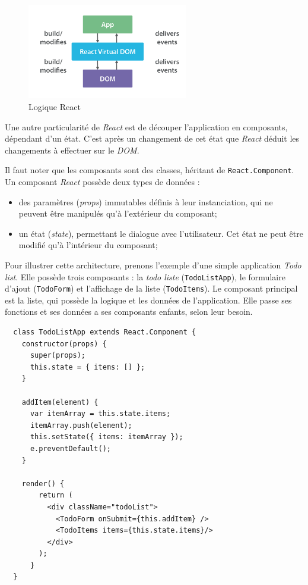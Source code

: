 \documentclass[12pt,a4paper]{article}
\providecommand{\tightlist}{%
  \setlength{\itemsep}{0pt}\setlength{\parskip}{0pt}}
\begin{document}
  \bigskip

  \begin{figure}[h]
    \centering
    \includegraphics[width=7cm]{figures/react-map.png}
    \caption{Logique React}
  \end{figure}

  \bigskip

  Une autre particularité de \emph{React} est de découper l'application en
  composants, dépendant d'un état. C'est après un changement de cet état
  que \emph{React} déduit les changements à effectuer sur le \emph{DOM}.

  \bigskip

  Il faut noter que les composants sont des classes, héritant de
  \texttt{React.Component}. Un composant \emph{React} possède deux types
  de données :

  \begin{itemize}
  \tightlist
  \item
    des paramètres (\emph{props}) immutables définis à leur instanciation,
    qui ne peuvent être manipulés qu'à l'extérieur du composant;
  \item
    un état (\emph{state}), permettant le dialogue avec l'utilisateur. Cet
    état ne peut être modifié qu'à l'intérieur du composant;
  \end{itemize}

  \bigskip

  Pour illustrer cette architecture, prenons l'exemple d'une simple
  application \emph{Todo list}. Elle possède trois composants : la
  \emph{todo liste} (\texttt{TodoListApp}), le formulaire d'ajout
  (\texttt{TodoForm}) et l'affichage de la liste (\texttt{TodoItems}). Le
  composant principal est la liste, qui possède la logique et les données
  de l'application. Elle passe ses fonctions et ses données a ses
  composants enfants, selon leur besoin.

  \begin{verbatim}
  class TodoListApp extends React.Component {
    constructor(props) {
      super(props);
      this.state = { items: [] };
    }

    addItem(element) {
      var itemArray = this.state.items;
      itemArray.push(element);
      this.setState({ items: itemArray });
      e.preventDefault();
    }

    render() {
        return (
          <div className="todoList">
            <TodoForm onSubmit={this.addItem} />
            <TodoItems items={this.state.items}/>
          </div>
        );
      }
  }
  \end{verbatim}
\end{document}
